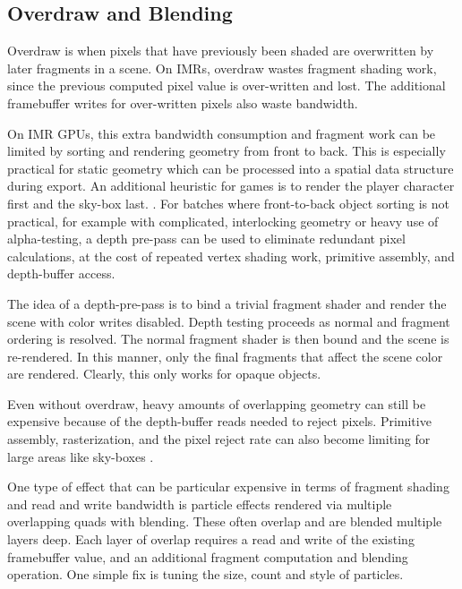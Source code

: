 \subsection{Overdraw and Blending}\label{Jon-McCaffrey-Overdraw-And-Blending}
 Overdraw is when pixels
that have previously been shaded are overwritten by later fragments in a scene.
On IMRs, overdraw wastes fragment shading work, since the previous computed
pixel value is over-written and lost.  The additional framebuffer writes for
over-written pixels also waste bandwidth.

On IMR GPUs, this extra bandwidth consumption and fragment work can be limited
by sorting and rendering geometry from front to back.  This is especially
practical for static geometry which can be processed into a spatial data
structure during export.  An additional heuristic for games is to render the
player character first and the sky-box last.  \cite{Pranckevicius11a}.  For
batches where front-to-back object sorting is not practical, for example with
complicated, interlocking geometry or heavy use of alpha-testing, a depth
pre-pass can be used to eliminate redundant pixel calculations, at the cost of
repeated vertex shading work, primitive assembly, and depth-buffer access.

The idea of a depth-pre-pass is to bind a trivial fragment shader and render
the scene with color writes disabled.  Depth testing proceeds as normal and
fragment ordering is resolved.  The normal fragment shader is then bound and
the scene is re-rendered.  In this manner, only the final fragments that affect
the scene color are rendered.  Clearly, this only works for opaque objects.

Even without overdraw, heavy amounts of overlapping geometry can still be
expensive because of the depth-buffer reads needed to reject pixels.  Primitive
assembly, rasterization, and the pixel reject rate can also become limiting for
large areas like sky-boxes \cite{Pranckevicius11a}.

One type of effect that can be particular expensive in terms of fragment
shading and read and write bandwidth is particle effects rendered via multiple
overlapping quads with blending.  These often overlap and are blended multiple
layers deep.  Each layer of overlap requires a read and write of the existing
framebuffer value, and an additional fragment computation and blending
operation.  One simple fix is tuning the size, count and style of particles.

